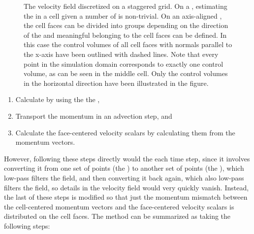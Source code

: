 \begin{figure}
{
    }
    \caption{The velocity field discretized on a staggered grid.  On a , estimating the  in a cell given a number of   is non-trivial.  On an axis-aligned , the cell faces can be divided into groups depending on the direction of the  and meaningful  belonging to the cell faces can be defined. In this case the control volumes of all cell faces with normals parallel to the x-axis have been outlined with dashed lines. Note that every point in the simulation domain corresponds to exactly one control volume, as can be seen in the middle cell. Only the control volumes in the horizontal direction have been illustrated in the figure.}
    \label{fig:velocity_advection}
\end{figure}

\begin{enumerate}
    \item Calculate   by using the the  ,
    \item Transport the momentum in an advection step, and
    \item Calculate the face-centered velocity scalars by calculating them from the momentum vectors.
\end{enumerate}

However, following these steps directly would  the  each time step, since it involves converting it from one set of points (the ) to another set of points (the ), which low-pass filters the field, and then converting it back again, which also low-pass filters the field, so details in the velocity field would very quickly vanish. Instead, the last of these steps is modified so that just the momentum mismatch between the cell-centered momentum vectors and the face-centered velocity scalars is distributed on the cell faces. The method can be summarized as taking the following steps:

